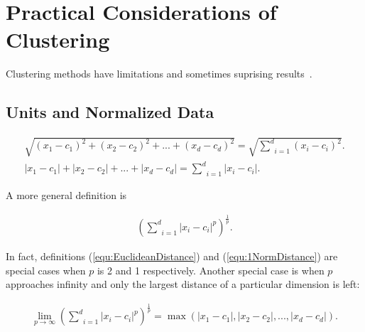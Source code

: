 \newcommand{\clusterlimitpath}{\thischapterpath}

\chapter{Practical Considerations of Clustering}
\label{ch:clusterlimit}

Clustering methods have limitations and sometimes suprising
results~\cite{James2013IntroductiontoStatistical}.


\section{Units and Normalized Data}



\begin{gather}
  \sqrt{(x_1 - c_1) ^ 2 + (x_2 - c_2) ^ 2 + ... + (x_d - c_d) ^ 2} = \sqrt{\underset{i=1}{\overset{d}{\sum}} (x_i - c_i) ^ 2}.
  \label{equ:EuclideanDistance}
    \\
    |x_1 - c_1 |  + | x_2 - c_2 |  + ... + | x_d - c_d | = \underset{i=1}{\overset{d}{\sum}} |x_i - c_i|.
    \label{equ:1NormDistance}
\end{gather}

A more general definition is

\begin{gather}
  (\underset{i=1}{\overset{d}{\sum}} |x_i - c_i| ^ p) ^ {\frac{1}{p}}.
\end{gather}

In fact, definitions (\ref{equ:EuclideanDistance}) and
(\ref{equ:1NormDistance}) are special cases when $p$ is 2 and 1
respectively.  Another special case is when $p$ approaches
infinity and only  the largest distance of a particular
dimension is left:

\begin{gather}
  \underset{p \rightarrow \infty}{\lim}(\underset{i=1}{\overset{d}{\sum}} |x_i - c_i| ^ p) ^ {\frac{1}{p}}
  = \max(|x_1 - c_1|, |x_2 - c_2|, ..., |x_d - c_d|).
\end{gather}
